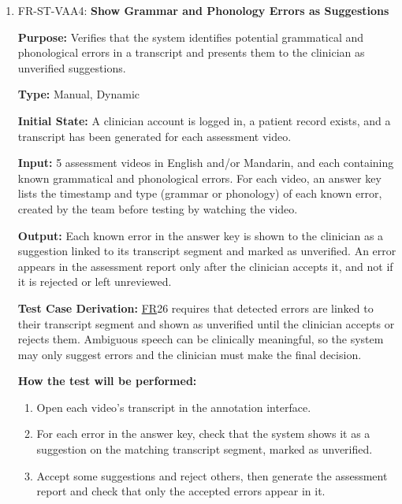 \documentclass[12pt, titlepage]{article}
\newcommand{\srsfr}[1]{\href{https://github.com/Nour-Fawaz/MacaBoca/blob/main/pdfs/SRS/SRS.pdf}{FR}}
\renewcommand{\_}{\oldunderscore\allowbreak}
\begin{document}
\begin{enumerate}
  \item FR-ST-VAA4: \textbf{Show Grammar and Phonology Errors as Suggestions\\}
  \begin{mdframed}[linewidth=0.5mm]
      \textbf{Purpose:} Verifies that the system identifies potential grammatical and phonological errors in a transcript and presents them to the clinician as unverified suggestions. \par
      \textbf{Type:} Manual, Dynamic \par
      \textbf{Initial State:} A clinician account is logged in, a patient record exists, and a transcript has been generated for each assessment video. \par
      \textbf{Input:} 5 assessment videos in English and/or Mandarin, and each containing known grammatical and phonological errors. For each video, an answer key lists the timestamp and type (grammar or phonology) of each known error, created by the team before testing by watching the video. \par
      \textbf{Output:} Each known error in the answer key is shown to the clinician as a suggestion linked to its transcript segment and marked as unverified. An error appears in the assessment report only after the clinician accepts it, and not if it is rejected or left unreviewed. \par
      \textbf{Test Case Derivation:} \srsfr*{26} requires that detected errors are linked to their transcript segment and shown as unverified until the clinician accepts or rejects them. Ambiguous speech can be clinically meaningful, so the system may only suggest errors and the clinician must make the final decision. \par
      \textbf{How the test will be performed:}
      \begin{enumerate}
      \item[1.] Open each video's transcript in the annotation interface.
      \item[2.] For each error in the answer key, check that the system shows it as a suggestion on the matching transcript segment, marked as unverified.
      \item[3.] Accept some suggestions and reject others, then generate the assessment report and check that only the accepted errors appear in it.
      \end{enumerate}
  \end{mdframed}
  
\end{enumerate}
\end{document}
